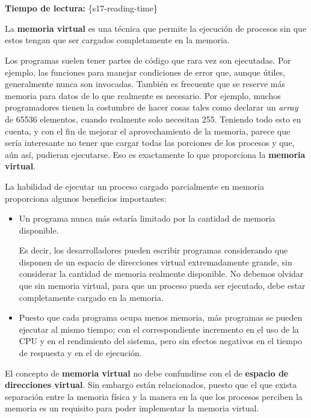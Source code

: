 \section{}

\textbf{Tiempo de lectura:} \{s17-reading-time\}

La \textbf{memoria virtual}{} es una técnica que permite la ejecución de
procesos sin que estos tengan que ser cargados completamente en la
memoria.

Los programas suelen tener partes de código que rara vez son ejecutadas.
Por ejemplo, las funciones para manejar condiciones de error que, aunque
útiles, generalmente nunca son invocadas. También es frecuente que se
reserve más memoria para datos de lo que realmente es necesario. Por
ejemplo, muchos programadores tienen la costumbre de hacer cosas tales
como declarar un \emph{array} de 65536 elementos, cuando realmente solo
necesitan 255. Teniendo todo esto en cuenta, y con el fin de mejorar el
aprovechamiento de la memoria, parece que sería interesante no tener que
cargar todas las porciones de los procesos y que, aún así, pudieran
ejecutarse. Eso es exactamente lo que proporciona la \textbf{memoria
virtual}.

La habilidad de ejecutar un proceso cargado parcialmente en memoria
proporciona algunos beneficios importantes:

\begin{itemize}
\item
  Un programa nunca más estaría limitado por la cantidad de memoria
  disponible.

  Es decir, los desarrolladores pueden escribir programas considerando
  que disponen de un espacio de direcciones virtual extremadamente
  grande, sin considerar la cantidad de memoria realmente disponible. No
  debemos olvidar que sin memoria virtual, para que un proceso pueda ser
  ejecutado, debe estar completamente cargado en la memoria.
\item
  Puesto que cada programa ocupa menos memoria, más programas se pueden
  ejecutar al mismo tiempo; con el correspondiente incremento en el uso
  de la CPU y en el rendimiento del sistema, pero sin efectos negativos
  en el tiempo de respuesta y en el de ejecución.
\end{itemize}

El concepto de \textbf{memoria virtual} no debe confundirse con el de
\textbf{espacio de direcciones virtual}. Sin embargo están relacionados,
puesto que el que exista separación entre la memoria física y la manera
en la que los procesos perciben la memoria es un requisito para poder
implementar la memoria virtual.

